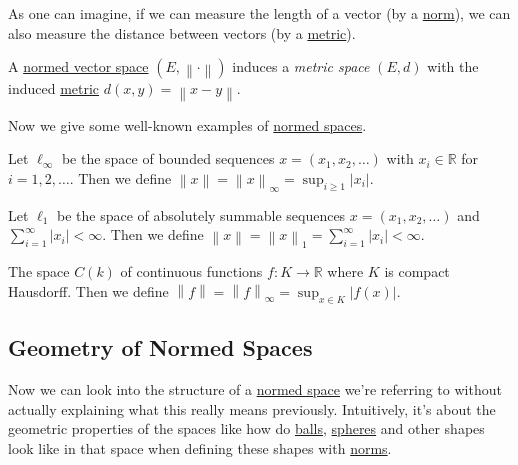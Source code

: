As one can imagine, if we can measure the length of a vector (by a \hyperref[def:norm]{norm}), we can also measure the distance between vectors (by a \hyperref[prev:metric]{metric}).

\begin{remark}
	A \hyperref[def:normed-vector-space]{normed vector space} \((E, \left\lVert \cdot\right\rVert )\) induces a \emph{metric space} \((E, d)\) with the induced \hyperref[prev:metric]{metric} \(d(x, y) = \left\lVert x- y\right\rVert \).
\end{remark}

Now we give some well-known examples of \hyperref[def:normed-vector-space]{normed spaces}.

\begin{eg}
	Let \(\ell _\infty \) be the space of bounded sequences \(x = (x_1, x_2, \ldots )\) with \(x_i\in \mathbb{R} \) for \(i = 1, 2, \ldots \). Then we define \(\left\lVert x\right\rVert = \left\lVert x\right\rVert _\infty = \sup _{i \geq 1}\left\vert x_i \right\vert \).
\end{eg}

\begin{eg}
	Let \(\ell _1\) be the space of absolutely summable sequences \(x = (x_1, x_2, \ldots)\) and \(\sum_{i=1}^{\infty} \left\vert x_i \right\vert < \infty\). Then we define \(\left\lVert x\right\rVert = \left\lVert x\right\rVert _1 = \sum_{i=1}^{\infty} \left\vert x_i \right\vert < \infty\).
\end{eg}

\begin{eg}
	The space \(C(k)\) of continuous functions \(f\colon K\to \mathbb{R} \) where \(K\) is compact Hausdorff. Then we define \(\left\lVert f\right\rVert = \left\lVert f\right\rVert _\infty = \sup _{x\in K}\left\vert f(x) \right\vert \).
\end{eg}

\subsection{Geometry of Normed Spaces}
Now we can look into the structure of a \hyperref[def:normed-vector-space]{normed space} we're referring to without actually explaining what this really means previously. Intuitively, it's about the geometric properties of the spaces like how do \hyperref[def:ball]{balls}, \hyperref[def:sphere]{spheres} and other shapes look like in that space when defining these shapes with \hyperref[def:norm]{norms}.

